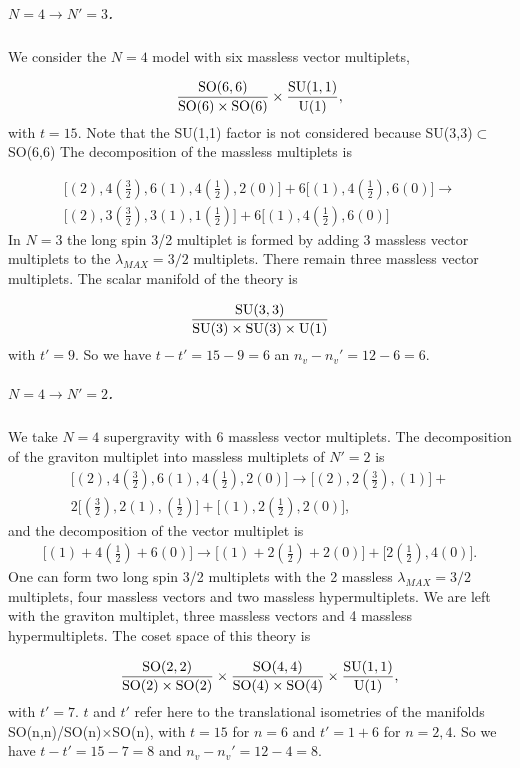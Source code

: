 \documentclass[a4paper,12pt]{article}
\begin{document}
\subparagraph{$N=4\rightarrow N'=3$.} We consider the $N=4$ model with six massless vector multiplets,

$$\frac{\mathrm{SO}(6,6)}{\mathrm{SO}(6)\times\mathrm{SO}(6)}\times
\frac{\mathrm{SU}(1,1)}{\mathrm{U}(1)}, $$ with $t=15$. Note that the SU(1,1)
factor is not considered because SU(3,3)$\subset$SO(6,6) The
decomposition of the massless multiplets is

\begin{eqnarray*}\bigl[(2), 4(\frac{3}{2}), 6(1), 4(\frac{1}{2}),2(0)\bigr]+
6\bigl[(1), 4(\frac{1}{2}), 6(0)\bigr]\rightarrow\\ \bigl[(2),
3(\frac{3}{2}), 3(1), 1(\frac{1}{2})\bigr]+6\bigl[(1),
4(\frac{1}{2}),6(0)\bigr]\end{eqnarray*} In $N=3$ the long spin
3/2 multiplet is formed by adding 3 massless vector  multiplets to
the $\lambda_{MAX}=3/2$ multiplets. There remain three massless
vector multiplets. The scalar manifold of the theory is

$$\frac{\mathrm{SU}(3,3)}{\mathrm{SU}(3)\times\mathrm{SU}(3)\times\mathrm{U}(1)} $$
with $t'=9$. So we have $t-t'=15-9=6$ an $n_v-n_v'=12-6=6$.

\subparagraph{$N=4\rightarrow N'=2$.} We take $N=4$ supergravity
with 6 massless   vector multiplets. The decomposition of the
graviton multiplet  into massless multiplets of $N'=2$ is
 \begin{eqnarray*}\bigl[(2), 4(\frac{3}{2}), 6(1), 4(\frac{1}{2}),2(0)\bigr]\rightarrow
\bigl[(2), 2(\frac{3}{2}), (1)\bigr]+\\2\bigl[(\frac{3}{2}), 2(1),
(\frac{1}{2})\bigr]+\bigl[ (1), 2(\frac{1}{2}),
2(0)\bigr],\end{eqnarray*} and the decomposition of the vector
multiplet is
\begin{eqnarray*}\bigl[ (1)+4(\frac{1}{2})+6(0)\bigr]\rightarrow
\bigl[ (1)+2(\frac{1}{2})+2(0)\bigr]+\bigl[2(\frac{1}{2}),
4(0)\bigr].\end{eqnarray*} One can form two long spin 3/2
multiplets with the 2 massless $\lambda_{MAX}=3/2$  multiplets,
four massless vectors and two massless hypermultiplets. We are
left with the graviton multiplet, three massless vectors and 4
massless hypermultiplets. The coset space of this  theory is

$$\frac{\mathrm{SO}(2,2)}{\mathrm{SO}(2)\times \mathrm{SO}(2)}\times
\frac{\mathrm{SO}(4,4)}{\mathrm{SO}(4)\times
\mathrm{SO}(4)}\times\frac{\mathrm{SU}(1,1)}{\mathrm{U}(1)}, $$ with $t'=7$. $t$ and
$t'$ refer here to the translational isometries of the manifolds
SO(n,n)/SO(n)$\times$SO(n), with $t=15$ for $n=6$ and $t'=1+6$ for
$n=2,4$. So we have $t-t'=15-7=8$ and $n_v-n_v'=12-4=8$.
\end{document}
